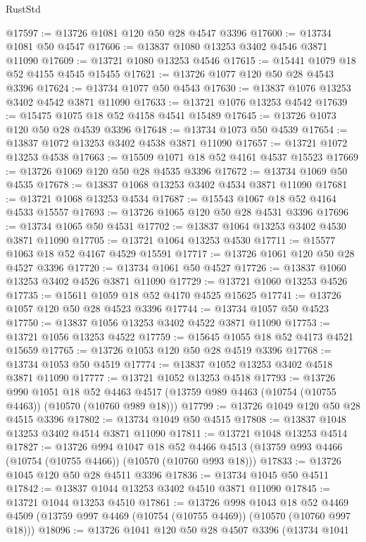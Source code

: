 \begin{lexlean}{RustStd}
\begin{coremodule}
@17597 := @13726 @1081 @120 @50 @28 @4547 @3396
@17600 := @13734 @1081 @50 @4547
@17606 := @13837 @1080 @13253 @3402 @4546 @3871 @11090
@17609 := @13721 @1080 @13253 @4546
@17615 := @15441 @1079 @18 @52 @4155 @4545 @15455
@17621 := @13726 @1077 @120 @50 @28 @4543 @3396
@17624 := @13734 @1077 @50 @4543
@17630 := @13837 @1076 @13253 @3402 @4542 @3871 @11090
@17633 := @13721 @1076 @13253 @4542
@17639 := @15475 @1075 @18 @52 @4158 @4541 @15489
@17645 := @13726 @1073 @120 @50 @28 @4539 @3396
@17648 := @13734 @1073 @50 @4539
@17654 := @13837 @1072 @13253 @3402 @4538 @3871 @11090
@17657 := @13721 @1072 @13253 @4538
@17663 := @15509 @1071 @18 @52 @4161 @4537 @15523
@17669 := @13726 @1069 @120 @50 @28 @4535 @3396
@17672 := @13734 @1069 @50 @4535
@17678 := @13837 @1068 @13253 @3402 @4534 @3871 @11090
@17681 := @13721 @1068 @13253 @4534
@17687 := @15543 @1067 @18 @52 @4164 @4533 @15557
@17693 := @13726 @1065 @120 @50 @28 @4531 @3396
@17696 := @13734 @1065 @50 @4531
@17702 := @13837 @1064 @13253 @3402 @4530 @3871 @11090
@17705 := @13721 @1064 @13253 @4530
@17711 := @15577 @1063 @18 @52 @4167 @4529 @15591
@17717 := @13726 @1061 @120 @50 @28 @4527 @3396
@17720 := @13734 @1061 @50 @4527
@17726 := @13837 @1060 @13253 @3402 @4526 @3871 @11090
@17729 := @13721 @1060 @13253 @4526
@17735 := @15611 @1059 @18 @52 @4170 @4525 @15625
@17741 := @13726 @1057 @120 @50 @28 @4523 @3396
@17744 := @13734 @1057 @50 @4523
@17750 := @13837 @1056 @13253 @3402 @4522 @3871 @11090
@17753 := @13721 @1056 @13253 @4522
@17759 := @15645 @1055 @18 @52 @4173 @4521 @15659
@17765 := @13726 @1053 @120 @50 @28 @4519 @3396
@17768 := @13734 @1053 @50 @4519
@17774 := @13837 @1052 @13253 @3402 @4518 @3871 @11090
@17777 := @13721 @1052 @13253 @4518
@17793 := @13726
    @990
    @1051
    @18
    @52
    @4463
    @4517
    (@13759 @989 @4463 (@10754 (@10755 @4463)) (@10570 (@10760 @989 @18)))
@17799 := @13726 @1049 @120 @50 @28 @4515 @3396
@17802 := @13734 @1049 @50 @4515
@17808 := @13837 @1048 @13253 @3402 @4514 @3871 @11090
@17811 := @13721 @1048 @13253 @4514
@17827 := @13726
    @994
    @1047
    @18
    @52
    @4466
    @4513
    (@13759 @993 @4466 (@10754 (@10755 @4466)) (@10570 (@10760 @993 @18)))
@17833 := @13726 @1045 @120 @50 @28 @4511 @3396
@17836 := @13734 @1045 @50 @4511
@17842 := @13837 @1044 @13253 @3402 @4510 @3871 @11090
@17845 := @13721 @1044 @13253 @4510
@17861 := @13726
    @998
    @1043
    @18
    @52
    @4469
    @4509
    (@13759 @997 @4469 (@10754 (@10755 @4469)) (@10570 (@10760 @997 @18)))
@18096 := @13726
    @1041
    @120
    @50
    @28
    @4507
    @3396
    (@13734
      @1041

\end{coremodule}
\end{lexlean}
